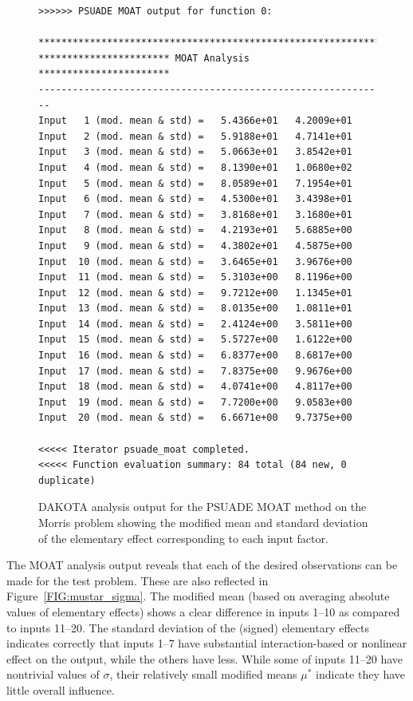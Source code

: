 \begin{figure}[ht!]
\centering
\begin{bigbox}
\begin{small}
\begin{verbatim}
>>>>>> PSUADE MOAT output for function 0:

*************************************************************
*********************** MOAT Analysis ***********************
-------------------------------------------------------------
Input   1 (mod. mean & std) =   5.4366e+01   4.2009e+01 
Input   2 (mod. mean & std) =   5.9188e+01   4.7141e+01 
Input   3 (mod. mean & std) =   5.0663e+01   3.8542e+01 
Input   4 (mod. mean & std) =   8.1390e+01   1.0680e+02 
Input   5 (mod. mean & std) =   8.0589e+01   7.1954e+01 
Input   6 (mod. mean & std) =   4.5300e+01   3.4398e+01 
Input   7 (mod. mean & std) =   3.8168e+01   3.1680e+01 
Input   8 (mod. mean & std) =   4.2193e+01   5.6885e+00 
Input   9 (mod. mean & std) =   4.3802e+01   4.5875e+00 
Input  10 (mod. mean & std) =   3.6465e+01   3.9676e+00 
Input  11 (mod. mean & std) =   5.3103e+00   8.1196e+00 
Input  12 (mod. mean & std) =   9.7212e+00   1.1345e+01 
Input  13 (mod. mean & std) =   8.0135e+00   1.0811e+01 
Input  14 (mod. mean & std) =   2.4124e+00   3.5811e+00 
Input  15 (mod. mean & std) =   5.5727e+00   1.6122e+00 
Input  16 (mod. mean & std) =   6.8377e+00   8.6817e+00 
Input  17 (mod. mean & std) =   7.8375e+00   9.9676e+00 
Input  18 (mod. mean & std) =   4.0741e+00   4.8117e+00 
Input  19 (mod. mean & std) =   7.7200e+00   9.0583e+00 
Input  20 (mod. mean & std) =   6.6671e+00   9.7375e+00 

<<<<< Iterator psuade_moat completed.
<<<<< Function evaluation summary: 84 total (84 new, 0 duplicate)
\end{verbatim}
\end{small}
\end{bigbox}
\caption[DAKOTA analysis output for PSUADE
MOAT.]{\label{FIG:moat:out_results} DAKOTA analysis output for the
PSUADE MOAT method on the Morris problem showing the modified
mean and standard deviation of the elementary effect corresponding to
each input factor.}
\end{figure}
The MOAT analysis output reveals that each of the desired observations
can be made for the test problem.  These are also reflected in
Figure~\ref{FIG:mustar_sigma}.  The modified mean (based on averaging
absolute values of elementary effects) shows a clear difference in
inputs 1--10 as compared to inputs 11--20.  The standard deviation of
the (signed) elementary effects indicates correctly that inputs 1--7
have substantial interaction-based or nonlinear effect on the output,
while the others have less.  While some of inputs 11--20 have
nontrivial values of $\sigma$, their relatively small modified means
$\mu^*$ indicate they have little overall influence.

